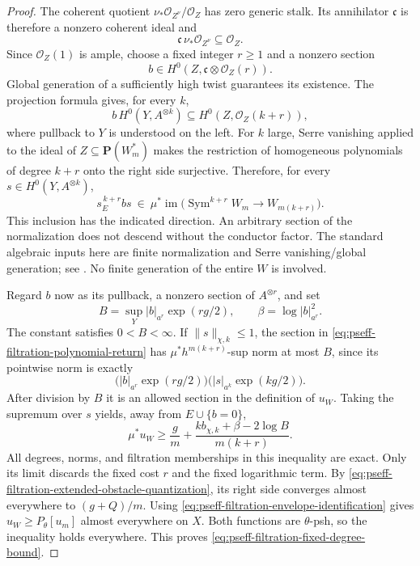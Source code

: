 \begin{proof}
The coherent quotient
\(\nu_*\mathcal O_{Z^\nu}/\mathcal O_Z\) has zero generic stalk.
Its annihilator \(\mathfrak c\) is therefore a nonzero coherent ideal and
\[
              \mathfrak c\,\nu_*\mathcal O_{Z^\nu}\subseteq\mathcal O_Z.
\]
Since \(\mathcal O_Z(1)\) is ample, choose a fixed integer \(r\geq1\) and
a nonzero section
\[
                  b\in H^0(Z,\mathfrak c\otimes\mathcal O_Z(r)).
\]
Global generation of a sufficiently high twist guarantees its existence.
The projection formula gives, for every \(k\),
\[
\tag{71.48i}\label{eq:pseff-filtration-conductor-inclusion}
 b\,H^0(Y,A^{\otimes k})
                    \subseteq H^0(Z,\mathcal O_Z(k+r)),
\]
where pullback to \(Y\) is understood on the left.
For \(k\) large, Serre vanishing applied to the ideal of
\(Z\subseteq\mathbf P(W_m^*)\) makes the restriction of homogeneous
polynomials of degree \(k+r\) onto the right side surjective.
Therefore, for every \(s\in H^0(Y,A^{\otimes k})\),
\[
\tag{71.48j}\label{eq:pseff-filtration-polynomial-return}
                 s_E^{\,k+r}bs
          \ \in\ \mu^*\operatorname{im}
                    \bigl(\operatorname{Sym}^{k+r}W_m
                                      \longrightarrow W_{m(k+r)}\bigr).
\]
This inclusion has the indicated direction.  An arbitrary section of the
normalization does not descend without the conductor factor.
The standard algebraic inputs here are finite normalization and Serre
vanishing/global generation; see \cite[Tags~0BXQ, 01PR, and 02O1]{StacksProject}.
No finite generation of the entire \(W\) is involved.

Regard \(b\) now as its pullback, a nonzero section of \(A^{\otimes r}\), and
set
\[
 B=\sup_Y |b|_{a^r}\exp(rg/2),\qquad
 \beta=\log|b|_{a^r}^2.
\]
The constant satisfies \(0<B<\infty\).
If \(\|s\|_{\chi,k}\leq1\), the section in
\eqref{eq:pseff-filtration-polynomial-return} has \(\mu^*h^{m(k+r)}\)-sup norm at most
\(B\), since its pointwise norm is exactly
\[
       \bigl(|b|_{a^r}\exp(rg/2)\bigr)
       \bigl(|s|_{a^k}\exp(kg/2)\bigr).
\]
After division by \(B\) it is an allowed section in the definition of
\(u_W\).  Taking the supremum over \(s\) yields, away from \(E\cup\{b=0\}\),
\[
\tag{71.48k}\label{eq:pseff-filtration-pointwise-return}
 \mu^*u_W\geq
       \frac{g}{m}
       +\frac{k b_{\chi,k}+\beta-2\log B}{m(k+r)} .
\]
All degrees, norms, and filtration memberships in this inequality are
exact.  Only its limit discards the fixed cost \(r\) and the fixed
logarithmic term.
By \eqref{eq:pseff-filtration-extended-obstacle-quantization}, its right side converges
almost everywhere to \((g+Q)/m\).
Using \eqref{eq:pseff-filtration-envelope-identification} gives
\(u_W\geq P_\theta[u_m]\) almost everywhere on \(X\).
Both functions are \(\theta\)-psh, so the inequality holds everywhere.
This proves \eqref{eq:pseff-filtration-fixed-degree-bound}.


\end{proof}
